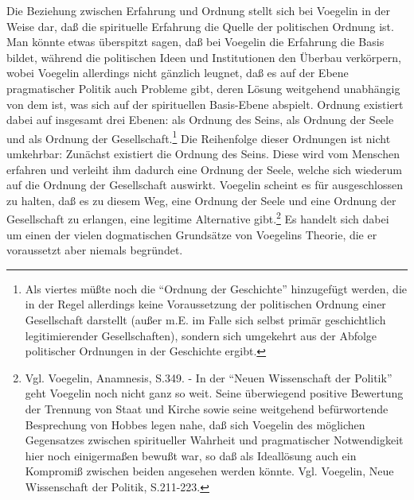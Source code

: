 Die Beziehung zwischen Erfahrung und Ordnung stellt sich bei Voegelin in der
Weise dar, daß die spirituelle Erfahrung die Quelle der politischen Ordnung
ist. Man könnte etwas überspitzt sagen, daß bei Voegelin die Erfahrung die
Basis bildet, während die politischen Ideen und Institutionen den Überbau
verkörpern, wobei Voegelin allerdings nicht gänzlich leugnet, daß es auf der
Ebene pragmatischer Politik auch Probleme gibt, deren Lösung weitgehend
unabhängig von dem ist, was sich auf der spirituellen Basis-Ebene abspielt.
Ordnung existiert dabei auf insgesamt drei Ebenen: als Ordnung des Seins, als
Ordnung der Seele und als Ordnung der Gesellschaft.\footnote{Als viertes müßte
  noch die "`Ordnung der Geschichte"' hinzugefügt werden, die in der Regel
  allerdings keine Voraussetzung der politischen Ordnung einer Gesellschaft
  darstellt (außer m.E. im Falle sich selbst primär geschichtlich
  legitimierender Gesellschaften), sondern sich umgekehrt aus der Abfolge
  politischer Ordnungen in der Geschichte ergibt.} Die Reihenfolge dieser
Ordnungen ist nicht umkehrbar: Zunächst existiert die Ordnung des Seins. Diese
wird vom Menschen erfahren und verleiht ihm dadurch eine Ordnung der Seele,
welche sich wiederum auf die Ordnung der Gesellschaft auswirkt. Voegelin
scheint es für ausgeschlossen zu halten, daß es zu diesem Weg, eine Ordnung
der Seele und eine Ordnung der Gesellschaft zu erlangen, eine legitime
Alternative gibt.\footnote{Vgl. Voegelin, Anamnesis, S.349. - In der "`Neuen
  Wissenschaft der Politik"' geht Voegelin noch nicht ganz so weit. Seine
  überwiegend positive Bewertung der Trennung von Staat und Kirche sowie
  seine weitgehend befürwortende Besprechung von Hobbes legen nahe, daß sich
  Voegelin des möglichen Gegensatzes zwischen spiritueller Wahrheit und
  pragmatischer Notwendigkeit hier noch einigermaßen bewußt war, so daß als
  Ideallösung auch ein Kompromiß zwischen beiden angesehen werden könnte. Vgl.
  Voegelin, Neue Wissenschaft der Politik, S.211-223.} Es handelt sich dabei
um einen der vielen dogmatischen Grundsätze von Voegelins Theorie, die er
voraussetzt aber niemals begründet.

